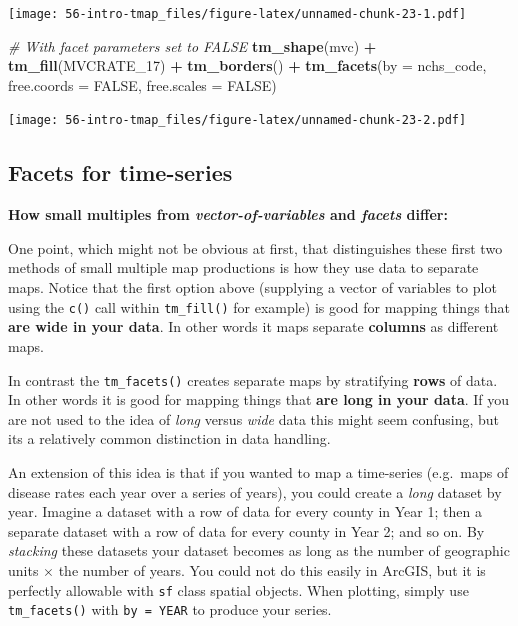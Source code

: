 \documentclass[
]{book}
\newenvironment{Shaded}{\begin{snugshade}}{\end{snugshade}}
\newcommand{\AttributeTok}[1]{\textcolor[rgb]{0.13,0.29,0.53}{#1}}
\newcommand{\CommentTok}[1]{\textcolor[rgb]{0.56,0.35,0.01}{\textit{#1}}}
\newcommand{\ConstantTok}[1]{\textcolor[rgb]{0.56,0.35,0.01}{#1}}
\newcommand{\FunctionTok}[1]{\textcolor[rgb]{0.13,0.29,0.53}{\textbf{#1}}}
\newcommand{\NormalTok}[1]{#1}
\newcommand{\SpecialCharTok}[1]{\textcolor[rgb]{0.81,0.36,0.00}{\textbf{#1}}}
\newcommand{\StringTok}[1]{\textcolor[rgb]{0.31,0.60,0.02}{#1}}
\begin{document}
\texttt{[image: 56-intro-tmap\_files/figure-latex/unnamed-chunk-23-1.pdf]}

\begin{Shaded}
\begin{Highlighting}[]
\CommentTok{\# With facet parameters set to FALSE}
\FunctionTok{tm\_shape}\NormalTok{(mvc) }\SpecialCharTok{+}
  \FunctionTok{tm\_fill}\NormalTok{(}\StringTok{\textquotesingle{}MVCRATE\_17\textquotesingle{}}\NormalTok{) }\SpecialCharTok{+}
  \FunctionTok{tm\_borders}\NormalTok{() }\SpecialCharTok{+}
  \FunctionTok{tm\_facets}\NormalTok{(}\AttributeTok{by =} \StringTok{\textquotesingle{}nchs\_code\textquotesingle{}}\NormalTok{, }\AttributeTok{free.coords =} \ConstantTok{FALSE}\NormalTok{, }\AttributeTok{free.scales =} \ConstantTok{FALSE}\NormalTok{)}
\end{Highlighting}
\end{Shaded}

\texttt{[image: 56-intro-tmap\_files/figure-latex/unnamed-chunk-23-2.pdf]}

\hypertarget{facets-for-time-series}{%
\subsection{Facets for time-series}\label{facets-for-time-series}}

\textbf{How small multiples from \emph{vector-of-variables} and \emph{facets} differ:}

One point, which might not be obvious at first, that distinguishes these first two methods of small multiple map productions is how they use data to separate maps. Notice that the first option above (supplying a vector of variables to plot using the \texttt{c()} call within \texttt{tm\_fill()} for example) is good for mapping things that \textbf{are wide in your data}. In other words it maps separate \textbf{columns} as different maps.

In contrast the \texttt{tm\_facets()} creates separate maps by stratifying \textbf{rows} of data. In other words it is good for mapping things that \textbf{are long in your data}. If you are not used to the idea of \emph{long} versus \emph{wide} data this might seem confusing, but its a relatively common distinction in data handling.

An extension of this idea is that if you wanted to map a time-series (e.g.~maps of disease rates each year over a series of years), you could create a \emph{long} dataset by year. Imagine a dataset with a row of data for every county in Year 1; then a separate dataset with a row of data for every county in Year 2; and so on. By \emph{stacking} these datasets your dataset becomes as long as the number of geographic units \(\times\) the number of years. You could not do this easily in ArcGIS, but it is perfectly allowable with \texttt{sf} class spatial objects. When plotting, simply use \texttt{tm\_facets()} with \texttt{by\ =\ YEAR} to produce your series.
\end{document}
